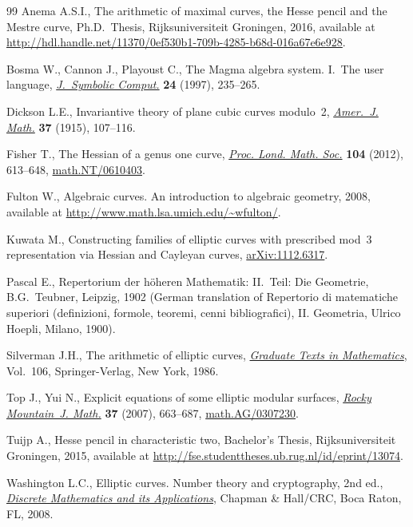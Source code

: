 \documentclass[11pt]{article}
\numberwithin{equation}{section}
\begin{document}
\begin{thebibliography}{99}
Anema A.S.I., The arithmetic of maximal curves, the {H}esse pencil and the {M}estre
 curve, Ph.D.~Thesis, Rijksuniversiteit Groningen, 2016, available at
 \url{http://hdl.handle.net/11370/0ef530b1-709b-4285-b68d-016a67e6e928}.

Bosma W., Cannon J., Playoust C., The {M}agma algebra system. {I}.~{T}he user
 language, \href{https://doi.org/10.1006/jsco.1996.0125}{\textit{J.~Symbolic Comput.}} \textbf{24} (1997), 235--265.

Dickson L.E., Invariantive theory of plane cubic curves modulo~2,
 \href{https://doi.org/10.2307/2370419}{\textit{Amer.~J. Math.}} \textbf{37} (1915), 107--116.

Fisher T., The {H}essian of a genus one curve, \href{https://doi.org/10.1112/plms/pdr039}{\textit{Proc. Lond. Math. Soc.}}
 \textbf{104} (2012), 613--648, \href{https://arxiv.org/abs/math.NT/0610403}{math.NT/0610403}.

Fulton W., Algebraic curves. {A}n introduction to algebraic geometry, 2008,
 {a}vailable at \url{http://www.math.lsa.umich.edu/~wfulton/}.

Kuwata M., Constructing families of elliptic curves with prescribed mod~3
 representation via {H}essian and {C}ayleyan curves, \href{https://arxiv.org/abs/1112.6317}{arXiv:1112.6317}.

Pascal E., Repertorium der h\"oheren Mathematik: II.~Teil: Die Geometrie,
 B.G.~Teubner, Leipzig, 1902 (German translation of Repertorio di
  matematiche superiori (definizioni, formole, teoremi, cenni bibliografici), II. Geometria, Ulrico Hoepli, Milano, 1900).

Silverman J.H., The arithmetic of elliptic curves, \href{https://doi.org/10.1007/978-1-4757-1920-8}{\textit{Graduate Texts in
 Mathematics}}, Vol.~106, Springer-Verlag, New York, 1986.

Top J., Yui N., Explicit equations of some elliptic modular surfaces,
 \href{https://doi.org/10.1216/rmjm/1181068772}{\textit{Rocky Mountain~J. Math.}} \textbf{37} (2007), 663--687,
 \href{https://arxiv.org/abs/math.AG/0307230}{math.AG/0307230}.

Tuijp A., Hesse pencil in characteristic two, {B}achelor's Thesis,
 Rijksuniversiteit Groningen, 2015, available at
 \url{http://fse.studenttheses.ub.rug.nl/id/eprint/13074}.

Washington L.C., Elliptic curves. Number theory and cryptography, 2nd ed.,
 \href{https://doi.org/10.1201/9781420071474}{\textit{Discrete Mathematics and its Applications}}, Chapman \& Hall/CRC, Boca Raton,
 FL, 2008.

\end{thebibliography}
\end{document}
